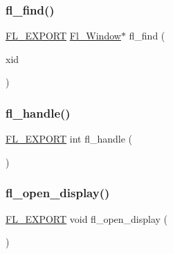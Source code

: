 \mbox{\label{x_8_h_a4f60f8f2a47f584ee83dd0118a058cfe}} 
\subsubsection{\texorpdfstring{fl\+\_\+find()}{fl\_find()}}
{\footnotesize\ttfamily \hyperlink{_fl___export_8_h_aa9ba29a18aee9d738370a06eeb4470fc}{F\+L\+\_\+\+E\+X\+P\+O\+RT} \hyperlink{class_fl___window}{Fl\+\_\+\+Window}$\ast$ fl\+\_\+find (\begin{DoxyParamCaption}\item[{\hyperlink{mac_8_h_a213656d363e884b651cc92f58e863fc6}{Window}}]{xid }\end{DoxyParamCaption})}

\mbox{\label{x_8_h_aaccfba15ffa706de7d40045c1ad1d823}} 
\subsubsection{\texorpdfstring{fl\+\_\+handle()}{fl\_handle()}}
{\footnotesize\ttfamily \hyperlink{_fl___export_8_h_aa9ba29a18aee9d738370a06eeb4470fc}{F\+L\+\_\+\+E\+X\+P\+O\+RT} int fl\+\_\+handle (\begin{DoxyParamCaption}\item[{const X\+Event \&}]{ }\end{DoxyParamCaption})}

\mbox{\label{x_8_h_a49e006a2712bfc7ac69d38f8981e87e8}} 
\subsubsection{\texorpdfstring{fl\+\_\+open\+\_\+display()}{fl\_open\_display()}\hspace{0.1cm}{\footnotesize\ttfamily [1/2]}}
{\footnotesize\ttfamily \hyperlink{_fl___export_8_h_aa9ba29a18aee9d738370a06eeb4470fc}{F\+L\+\_\+\+E\+X\+P\+O\+RT} void fl\+\_\+open\+\_\+display (\begin{DoxyParamCaption}{ }\end{DoxyParamCaption})}

